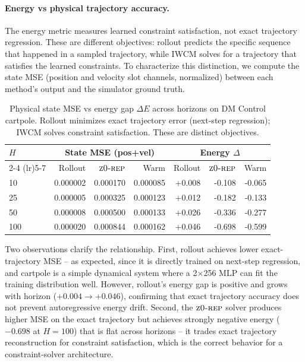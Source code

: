 \documentclass[12pt]{article}
\newcommand{\zrep}{\textsc{z0-rep}}
\begin{document}
\paragraph{Energy vs physical trajectory accuracy.}
The energy metric measures learned constraint satisfaction, not exact trajectory regression. These are different objectives: rollout predicts the specific sequence that happened in a sampled trajectory, while IWCM solves for a trajectory that satisfies the learned constraints. To characterize this distinction, we compute the state MSE (position and velocity slot channels, normalized) between each method's output and the simulator ground truth.

\begin{table}[h]
\centering
\caption{Physical state MSE vs energy gap $\Delta E$ across horizons on DM Control cartpole. Rollout minimizes exact trajectory error (next-step regression); IWCM solves constraint satisfaction. These are distinct objectives.}
\label{tab:energy_mse}
\begin{tabular}{@{}lrrr|rrr@{}}
\toprule
$H$ & \multicolumn{3}{c}{State MSE (pos+vel)} & \multicolumn{3}{c}{Energy $\Delta$} \\
\cmidrule(lr){2-4} \cmidrule(lr){5-7}
 & Rollout & $\zrep$ & Warm & Rollout & $\zrep$ & Warm \\
\midrule
10 & 0.000002 & 0.000170 & 0.000085 & +0.008 & -0.108 & -0.065 \\
25 & 0.000005 & 0.000325 & 0.000123 & +0.012 & -0.182 & -0.133 \\
50 & 0.000008 & 0.000500 & 0.000133 & +0.026 & -0.336 & -0.277 \\
100 & 0.000020 & 0.000844 & 0.000162 & +0.046 & -0.698 & -0.599 \\
\bottomrule
\end{tabular}
\end{table}

Two observations clarify the relationship. First, rollout achieves lower exact-trajectory MSE -- as expected, since it is directly trained on next-step regression, and cartpole is a simple dynamical system where a 2$\times$256 MLP can fit the training distribution well. However, rollout's energy gap is positive and grows with horizon ($+0.004 \to +0.046$), confirming that exact trajectory accuracy does not prevent autoregressive energy drift. Second, the $\zrep$ solver produces higher MSE on the exact trajectory but achieves strongly negative energy ($-0.698$ at $H=100$) that is flat across horizons -- it trades exact trajectory reconstruction for constraint satisfaction, which is the correct behavior for a constraint-solver architecture.
\end{document}
